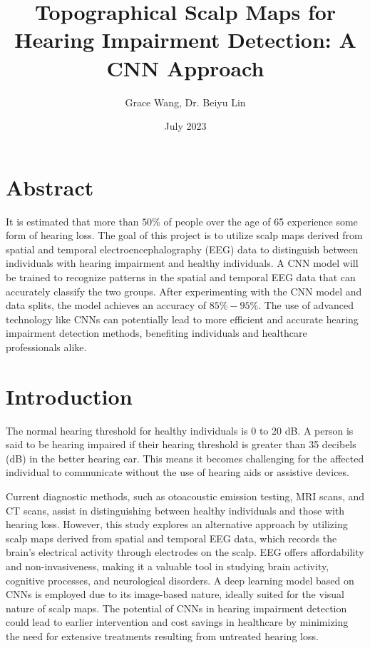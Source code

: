 \documentclass{article}
\title{Topographical Scalp Maps for Hearing Impairment Detection: A CNN Approach
}
\author{Grace Wang, Dr. Beiyu Lin }
\date{July 2023}
\begin{document}
\maketitle

\section{Abstract}
It is estimated that more than $50\%$ of people over the age of 65 experience some form of hearing loss. The goal of this project is to utilize scalp maps derived from spatial and temporal electroencephalography (EEG) data to distinguish between individuals with hearing impairment and healthy individuals. A CNN model will be trained to recognize patterns in the spatial and temporal EEG data that can accurately classify the two groups. After experimenting with the CNN model and data splits, the model achieves an accuracy of $85\%-95\%$. The use of advanced technology like CNNs can potentially lead to more efficient and accurate hearing impairment detection methods, benefiting individuals and healthcare professionals alike.

\section{Introduction}
The normal hearing threshold for healthy individuals is 0 to 20 dB. A person is said to be hearing impaired if their hearing threshold is greater than 35 decibels (dB) in the better hearing ear. This means it becomes challenging for the affected individual to communicate without the use of hearing aids or assistive devices.

Current diagnostic methods, such as otoacoustic emission testing, MRI scans, and CT scans, assist in distinguishing between healthy individuals and those with hearing loss. However, this study explores an alternative approach by utilizing scalp maps derived from spatial and temporal EEG data, which records the brain's electrical activity through electrodes on the scalp. EEG offers affordability and non-invasiveness, making it a valuable tool in studying brain activity, cognitive processes, and neurological disorders. A deep learning model based on CNNs is employed due to its image-based nature, ideally suited for the visual nature of scalp maps. The potential of CNNs in hearing impairment detection could lead to earlier intervention and cost savings in healthcare by minimizing the need for extensive treatments resulting from untreated hearing loss.
\end{document}
